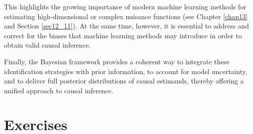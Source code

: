 This highlights the growing importance of modern machine learning methods for estimating high-dimensional or complex nuisance functions (see Chapter \ref{chap13} and Section \ref{sec12_11}). At the same time, however, it is essential to address and correct for the biases that machine learning methods may introduce in order to obtain valid causal inference.

Finally, the Bayesian framework provides a coherent way to integrate these identification strategies with prior information, to account for model uncertainty, and to deliver full posterior distributions of causal estimands, thereby offering a unified approach to causal inference.


\section{Exercises}

